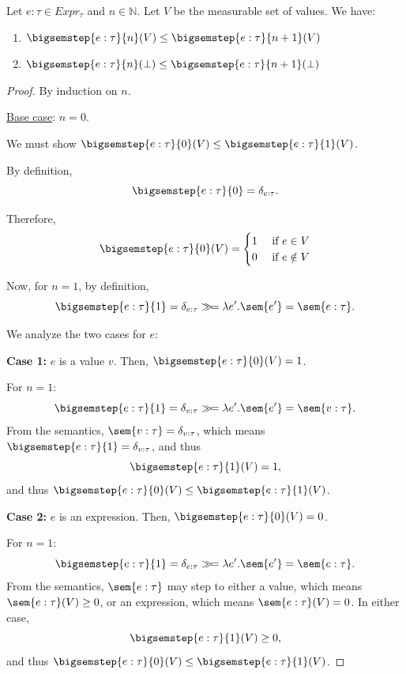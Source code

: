 \begin{lemma}
	\label{lem:bigstepsem}
	Let $e : \tau \in Expr_{\tau}$ and $n \in \mathbb{N}$. Let $V$ be the measurable set of values. We have:
	\begin{enumerate}
		\item\label{lem:bigstepsem1} $\bigsemstep{e : \tau}{n}(V) \leq \bigsemstep{e : \tau}{n+1}(V)$
		\item\label{lem:bigstepsem2} $\bigsemstep{e : \tau}{n}(\bot) \leq \bigsemstep{e : \tau}{n+1}(\bot)$
	\end{enumerate}
\end{lemma}
%
\begin{proof}
	By induction on $n$.

	\underline{Base case}: $n=0$.

	We must show $\bigsemstep{e : \tau}{0}(V) \leq \bigsemstep{e : \tau}{1}(V)$.

	By definition,
	\[
		\bigsemstep{e : \tau}{0} = \delta_{e : \tau}.
	\]

	Therefore,
	\[
		\bigsemstep{e : \tau}{0}(V) =
		\begin{cases}
			1 &\text{ if } e \in V \\
			0 &\text{ if } e \notin V
		\end{cases}
	\]

	Now, for $n=1$, by definition,
	\[
		\bigsemstep{e : \tau}{1} = \delta_{e : \tau} \gg\!= \lambda e'.\sem{e'} = \sem{e : \tau}.
	\]

	We analyze the two cases for $e$:

	\textbf{Case 1:} $e$ is a value $v$. Then, $\bigsemstep{e : \tau}{0}(V) = 1$.

	For $n=1$:
	\[
		\bigsemstep{e : \tau}{1} = \delta_{v : \tau} \gg\!= \lambda e'.\sem{e'} = \sem{v : \tau}.
	\]
	From the semantics, $\sem{v : \tau} = \delta_{v : \tau}$, which means $\bigsemstep{e : \tau}{1} = \delta_{v : \tau}$, and thus
	\[
		\bigsemstep{e : \tau}{1}(V) = 1,
	\]
	and thus $\bigsemstep{e : \tau}{0}(V) \leq \bigsemstep{e : \tau}{1}(V)$.

	\textbf{Case 2:} $e$ is an expression. Then, $\bigsemstep{e : \tau}{0}(V) = 0$.

	For $n=1$:
	\[
		\bigsemstep{e : \tau}{1} = \delta_{e : \tau} \gg\!= \lambda e'.\sem{e'} = \sem{e : \tau}.
	\]
	From the semantics, $\sem{e : \tau}$ may step to either a value, which means $\sem{e : \tau}(V) \geq 0$, or an expression, which means $\sem{e : \tau}(V) = 0$. In either case, 
	\[
		\bigsemstep{e : \tau}{1}(V) \geq 0,
	\]
	and thus $\bigsemstep{e : \tau}{0}(V) \leq \bigsemstep{e : \tau}{1}(V)$.


\end{proof}
